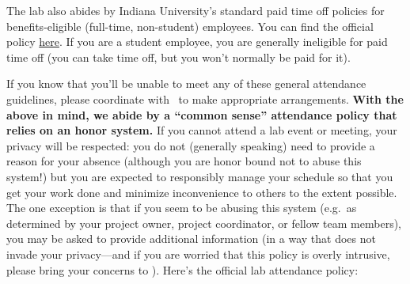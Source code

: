 \documentclass{tufte-book} %
\begin{document}
The lab also abides by Indiana University's standard paid time off policies for benefits-eligible (full-time, non-student) employees. You can find the official policy \href{http://hr.iu.edu/benefits/pto_exempt.html}{here}. If you are a student employee, you are generally ineligible for paid time off (you can take time off, but you won't normally be paid for it).

If you know that you'll be unable to meet any of these general attendance guidelines, please coordinate with \director~to make appropriate arrangements. \textbf{With the above in mind, we abide by a ``common sense'' attendance policy that relies on an honor system.} If you cannot attend a lab event or meeting, your privacy will be respected: you do not (generally speaking) need to provide a reason for your absence (although you are honor bound not to abuse this system!) but you are expected to responsibly manage your schedule so that you get your work done and minimize inconvenience to others to the extent possible. The one exception is that if you seem to be abusing this
system (e.g.\ as determined by your project owner, project coordinator, or fellow team members), you may be asked to provide additional information (in a way that does not invade your privacy---and if you are worried that this policy is overly intrusive, please bring your concerns to \director). Here's the official lab attendance policy:
\end{document}
